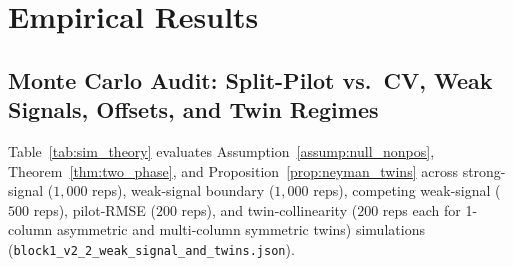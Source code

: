 \documentclass[11pt]{article}
\theoremstyle{remark}
\begin{document}
\section{Empirical Results}
\label{sec:results}

\subsection{Monte Carlo Audit: Split-Pilot vs.\ CV, Weak Signals, Offsets, and Twin Regimes}
\label{sec:res_sim}

Table~\ref{tab:sim_theory} evaluates Assumption~\ref{assump:null_nonpos}, Theorem~\ref{thm:two_phase}, and Proposition~\ref{prop:neyman_twins} across strong-signal ($1{,}000$ reps), weak-signal boundary ($1{,}000$ reps), competing weak-signal ($500$ reps), pilot-RMSE ($200$ reps), and twin-collinearity ($200$ reps each for 1-column asymmetric and multi-column symmetric twins) simulations (\texttt{block1\_v2\_2\_weak\_signal\_and\_twins.json}).
\end{document}
